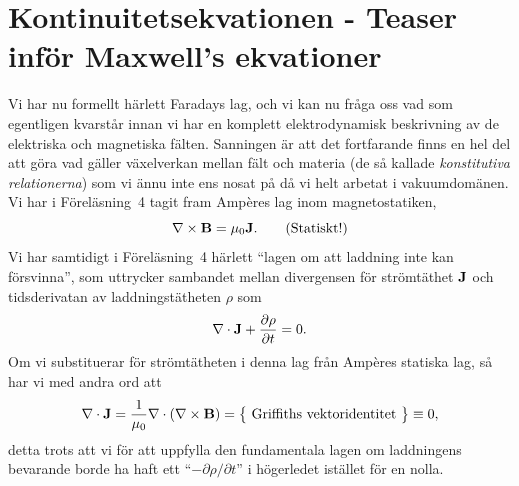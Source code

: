 {{{{\section{Kontinuitetsekvationen - Teaser inf{\"o}r Maxwell's ekvationer}
Vi har nu formellt h{\"a}rlett Faradays lag, och vi kan nu fr{\aa}ga oss vad
som egentligen kvarst{\aa}r innan vi har en komplett elektrodynamisk
beskrivning av de elektriska och magnetiska f{\"a}lten. Sanningen {\"a}r att
det fortfarande finns en hel del att g{\"o}ra vad g{\"a}ller v{\"a}xelverkan
mellan f{\"a}lt och materia (de s{\aa} kallade {\it konstitutiva relationerna})
som vi {\"a}nnu inte ens nosat p{\aa} d{\aa} vi helt arbetat i
vakuumdom{\"a}nen.
Vi har i F{\"o}rel{\"a}sning~4 tagit fram Amp\`eres lag inom magnetostatiken,
$$
  \nabla\times{\bf B}=\mu_0{\bf J}.\qquad\hbox{(Statiskt!)}
$$
Vi har samtidigt i F{\"o}rel{\"a}sning~4 h{\"a}rlett ``lagen om att laddning
inte kan f{\"o}rsvinna'', som uttrycker sambandet mellan divergensen f{\"o}r
str{\"o}mt{\"a}thet ${\bf J}$ och tidsderivatan av laddningst{\"a}theten
$\rho$ som
$$
  \nabla\cdot{\bf J}+{{\partial\rho}\over{\partial t}}=0.
$$
Om vi substituerar f{\"o}r str{\"o}mt{\"a}theten i denna lag fr{\aa}n
Amp\`eres statiska lag, s{\aa} har vi med andra ord att
$$
  \nabla\cdot{\bf J}
    ={{1}\over{\mu_0}}\nabla\cdot(\nabla\times{\bf B})
    =\big\{\hbox{ Griffiths vektoridentitet }\big\}
    \equiv 0,
$$
detta trots att vi f{\"o}r att uppfylla den fundamentala lagen om laddningens
bevarande borde ha haft ett ``$-{{\partial\rho}/{\partial t}}$'' i
h{\"o}gerledet ist{\"a}llet f{\"o}r en nolla.

}}}}
